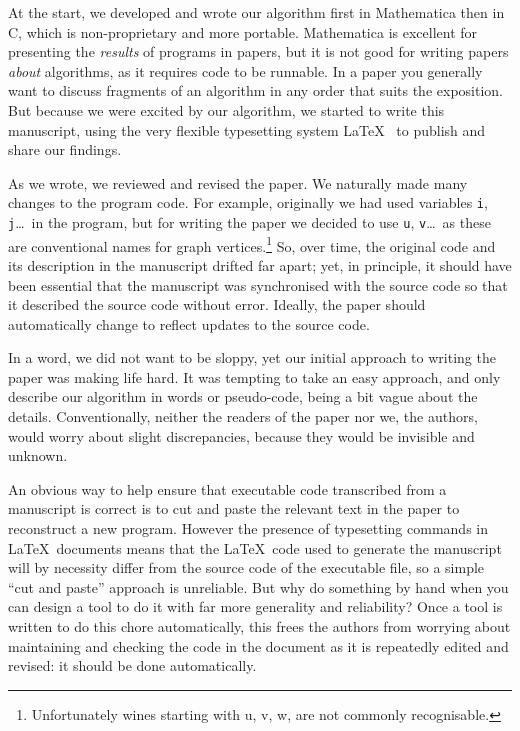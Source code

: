 \documentclass[12pt]{article}
\begin{document}
At the start, we developed and wrote our algorithm first in Mathematica then in C, which is non-proprietary and more portable. Mathematica is excellent for presenting the \emph{results\/} of programs in papers, but it is not good for writing papers \emph{about\/} algorithms, as it requires code to be runnable. In a paper you generally want to discuss fragments of an algorithm in any order that suits the exposition. But because we were excited by our algorithm, we started to write this manuscript, using the very flexible typesetting system \LaTeX\ \cite{latex} to publish and share our findings.

As we wrote, we reviewed and revised the paper. We naturally made many changes to the program code. For example, originally we had used variables \texttt{i}, \texttt{j}\ldots\ in the program, but for writing the paper we decided to use \texttt{u}, \texttt{v}\ldots\ as these are conventional names for graph vertices.\footnote{Unfortunately wines starting with u, v, w, are not commonly recognisable.} So, over time, the original code and its description in the manuscript drifted far apart; yet, in principle, it should have been essential that the manuscript was synchronised with the source code so that it described the source code without error. Ideally, the paper should automatically change to reflect updates to the source code.

In a word, we did not want to be sloppy, yet our initial approach to writing the paper was making life hard. It was tempting to take an easy approach, and only describe our algorithm in words or pseudo-code, being a bit vague about the details. Conventionally, neither the readers of the paper nor we, the authors, would worry about slight discrepancies, because they would be invisible and unknown.

An obvious way to help ensure that executable code transcribed from a manuscript is correct is to cut and paste the relevant text in the paper to reconstruct a new program. However the presence of typesetting commands in \LaTeX\ documents means that the \LaTeX\ code used to generate the manuscript will by necessity differ from the source code of the executable file, so a simple ``cut and paste'' approach is unreliable. But why do something by hand when you can design a tool to do it with far more generality and reliability? Once a tool is written to do this chore automatically, this frees the authors from worrying about maintaining and checking the code in the document as it is repeatedly edited and revised: it should be done automatically.
\end{document}
